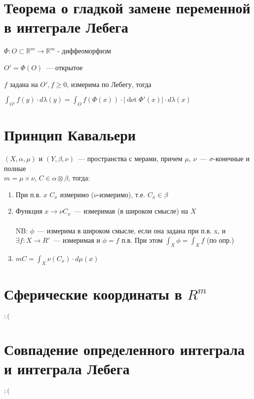\documentclass[paper=a4, fontsize=14pt]{report}
\begin{document}
\section{Теорема о гладкой замене переменной в интеграле Лебега}
$\Phi: O \subset \mathds{R}^m \rightarrow \mathds{R}^m$ - диффеоморфизм

$O' = \Phi(O)$~--- открытое

$f$ задана на $O', f \geqslant 0$, измерима по Лебегу, тогда

$\int_{O'}f(y) \cdot d \lambda(y) = \int_O f(\Phi(x)) \cdot |\det \Phi'(x)| \cdot d \lambda(x)$

\section{Принцип Кавальери}
	$(X, \alpha, \mu)$ и $(Y, \beta, \nu)$~--- пространства с мерами, причем $\mu$, $\nu$~--- $\sigma$-конечные и полные\\
	$m = \mu \times \nu$, $C \in \alpha\otimes\beta$, тогда:\\
	\begin{enumerate}
		\item
		При п.в. $x$ $C_x$ измеримо ($\nu$-измеримо), т.е. $C_x \in \beta$
		\item
		Функция $x \rightarrow \nu C_x$~--- измеримая (в широком смысле) на $X$\\ \\
		NB: $\phi$~--- измерима в широком смысле, если она задана при п.в. x, и $\exists f : X \rightarrow R'$~--- измеримая и $\phi = f$ п.в. При этом $\int_X \phi = \int_X f$ (по опр.)
		\item
		$m C = \int_X \nu(C_x) \cdot d\mu(x)$
	\end{enumerate}

\section{Сферические координаты в $ R^m $}

$:($

\section{Совпадение определенного интеграла и интеграла Лебега}

$:($
\end{document}
